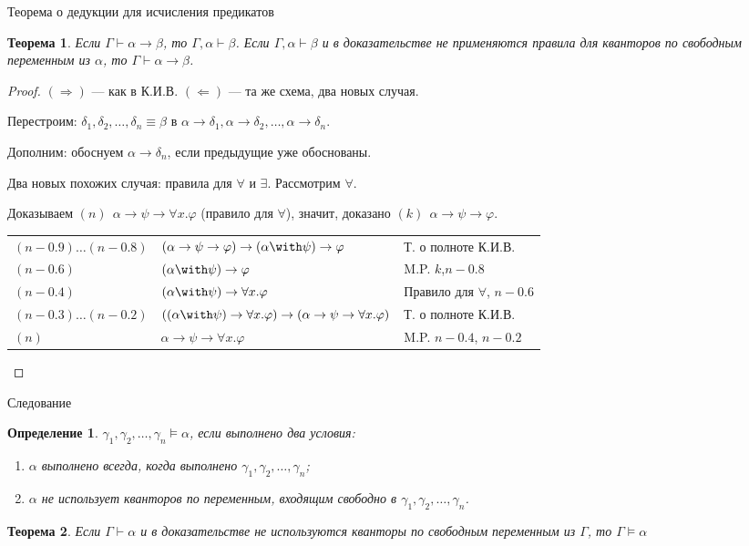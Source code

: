 \documentclass[aspectratio=169]{beamer}
\newtheorem{thm}{Теорема}[section]
\newtheorem{dfn}{Определение}[section]
\begin{document}
\begin{frame}{Теорема о дедукции для исчисления предикатов}
\begin{thm}Если $\Gamma\vdash\alpha\rightarrow\beta$, то $\Gamma,\alpha\vdash\beta$.
Если $\Gamma,\alpha\vdash\beta$ и в доказательстве не применяются правила для кванторов 
по свободным переменным из $\alpha$, то $\Gamma\vdash\alpha\rightarrow\beta$.\end{thm}
\begin{proof}$(\Rightarrow)$ --- как в К.И.В. \pause $(\Leftarrow)$ --- та же схема, два новых случая. \pause

Перестроим: $\delta_1, \delta_2, \dots, \delta_n \equiv \beta$ в $\alpha\rightarrow\delta_1, \alpha\rightarrow\delta_2, \dots, \alpha\rightarrow\delta_n$.

Дополним: обоснуем $\alpha\rightarrow\delta_n$, если предыдущие уже обоснованы.\pause

Два новых похожих случая: правила для $\forall$ и $\exists$. Рассмотрим $\forall$.

Доказываем $(n)\ \ \alpha\rightarrow\psi\rightarrow\forall x.\varphi$ (правило для $\forall$), значит, доказано  
$(k)\ \ \alpha\rightarrow\psi\rightarrow\varphi$. \pause
\begin{tabular}{lll}
$(n-0.9) \dots (n-0.8)$ & $(\alpha\rightarrow\psi\rightarrow\varphi)\rightarrow(\alpha\with\psi)\rightarrow\varphi$ & Т. о полноте К.И.В.\\
$(n-0.6)$ & $(\alpha\with\psi)\rightarrow\varphi$ & M.P. $k$,$n-0.8$\\\pause
$(n-0.4)$ & $(\alpha\with\psi)\rightarrow\forall x.\varphi$ & Правило для $\forall$, $n-0.6$\\\pause
$(n-0.3) \dots (n-0.2)$ & $((\alpha\with\psi)\rightarrow\forall x.\varphi)\rightarrow(\alpha\rightarrow\psi\rightarrow\forall x.\varphi)$ & Т. о полноте К.И.В.\\
$(n)$ & $\alpha\rightarrow\psi\rightarrow\forall x.\varphi$ & M.P. $n-0.4$, $n-0.2$
\end{tabular}

\end{proof}
\end{frame}


\begin{frame}{Следование}
\begin{dfn}$\gamma_1,\gamma_2,\dots,\gamma_n\models\alpha$, если выполнено два условия:
\begin{enumerate}
\item $\alpha$ выполнено всегда, когда выполнено $\gamma_1,\gamma_2,\dots,\gamma_n$;
\item $\alpha$ не использует кванторов по переменным, входящим свободно в $\gamma_1,\gamma_2,\dots,\gamma_n$.
\end{enumerate}
\end{dfn}

\begin{thm}Если $\Gamma\vdash\alpha$ и в доказательстве не используются кванторы по свободным
переменным из $\Gamma$, то $\Gamma\models\alpha$\end{thm}
\end{frame}
\end{document}
